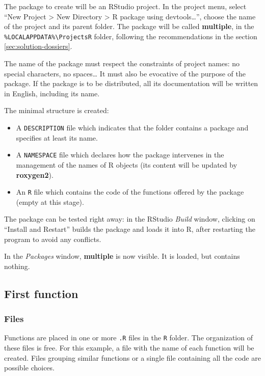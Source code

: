 \documentclass[
  12pt,
  american,
  a4paper,
  extrafontsizes,onecolumn,openright
  ]{memoir}
\providecommand{\tightlist}{%
  \setlength{\itemsep}{0pt}\setlength{\parskip}{0pt}}
\begin{document}
The package to create will be an RStudio project.
In the project menu, select \enquote{New Project \textgreater{} New Directory \textgreater{} R package using devtools\ldots{}}, choose the name of the project and its parent folder.
The package will be called \textbf{multiple}, in the \texttt{\%LOCALAPPDATA\%\textbackslash{}ProjectsR} folder, following the recommendations in the section \ref{sec:solution-dossiers}.

The name of the package must respect the constraints of project names: no special characters, no spaces\ldots{}
It must also be evocative of the purpose of the package.
If the package is to be distributed, all its documentation will be written in English, including its name.

The minimal structure is created:

\begin{itemize}
\tightlist
\item
  A \texttt{DESCRIPTION} file which indicates that the folder contains a package and specifies at least its name.
\item
  A \texttt{NAMESPACE} file which declares how the package intervenes in the management of the names of R objects (its content will be updated by \textbf{roxygen2}).
\item
  An \texttt{R} file which contains the code of the functions offered by the package (empty at this stage).
\end{itemize}

The package can be tested right away: in the RStudio \emph{Build} window, clicking on \enquote{Install and Restart} builds the package and loads it into R, after restarting the program to avoid any conflicts.

In the \emph{Packages} window, \textbf{multiple} is now visible.
It is loaded, but contains nothing.

\hypertarget{first-function}{%
\subsection{First function}\label{first-function}}

\hypertarget{files}{%
\subsubsection{Files}\label{files}}

Functions are placed in one or more \texttt{.R} files in the \texttt{R} folder.
The organization of these files is free.
For this example, a file with the name of each function will be created.
Files grouping similar functions or a single file containing all the code are possible choices.
\end{document}

